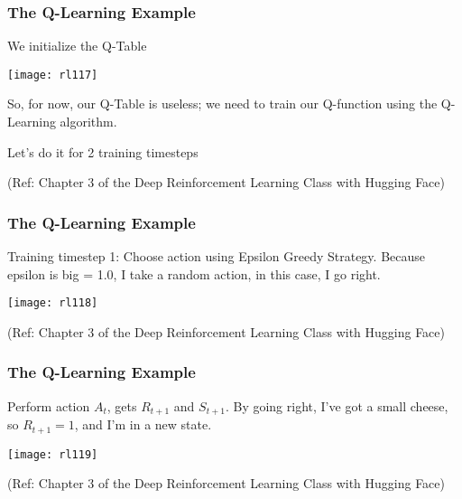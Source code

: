 \begin{frame}[fragile]\frametitle{The Q-Learning Example}

We initialize the Q-Table

\begin{center}
\texttt{[image: rl117]}
\end{center}

So, for now, our Q-Table is useless; we need to train our Q-function using the Q-Learning algorithm.

Let's do it for 2 training timesteps

{\tiny (Ref: Chapter 3 of the Deep Reinforcement Learning Class with Hugging Face)}

\end{frame}

\begin{frame}[fragile]\frametitle{The Q-Learning Example}

Training timestep 1: Choose action using Epsilon Greedy Strategy. Because epsilon is big = 1.0, I take a random action, in this case, I go right.

\begin{center}
\texttt{[image: rl118]}
\end{center}


{\tiny (Ref: Chapter 3 of the Deep Reinforcement Learning Class with Hugging Face)}

\end{frame}

\begin{frame}[fragile]\frametitle{The Q-Learning Example}

Perform action $A_t$, gets $R_{t+1}$ and $S_{t+1}$. By going right, I've got a small cheese, so $R_{t+1} = 1$, and I'm in a new state.

\begin{center}
\texttt{[image: rl119]}
\end{center}

{\tiny (Ref: Chapter 3 of the Deep Reinforcement Learning Class with Hugging Face)}

\end{frame}


